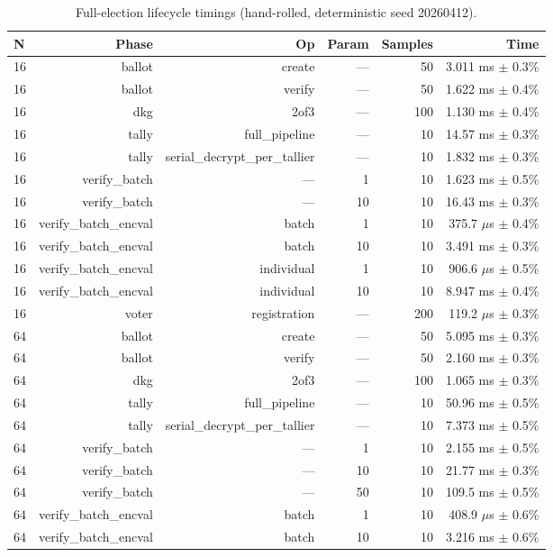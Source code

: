 \begin{table}[h]
  \centering
  \caption{Full-election lifecycle timings (hand-rolled, deterministic seed 20260412).}
  \label{tab:g4_election_lifecycle}
  \begin{tabular}{lrrrrr}
    \toprule
    N & Phase & Op & Param & Samples & Time \\
    \midrule
16 & ballot & create & — & 50 & 3.011 ms $\pm$ 0.3\% \\
16 & ballot & verify & — & 50 & 1.622 ms $\pm$ 0.4\% \\
16 & dkg & 2of3 & — & 100 & 1.130 ms $\pm$ 0.4\% \\
16 & tally & full\_pipeline & — & 10 & 14.57 ms $\pm$ 0.3\% \\
16 & tally & serial\_decrypt\_per\_tallier & — & 10 & 1.832 ms $\pm$ 0.3\% \\
16 & verify\_batch & — & 1 & 10 & 1.623 ms $\pm$ 0.5\% \\
16 & verify\_batch & — & 10 & 10 & 16.43 ms $\pm$ 0.3\% \\
16 & verify\_batch\_encval & batch & 1 & 10 & 375.7 $\mu$s $\pm$ 0.4\% \\
16 & verify\_batch\_encval & batch & 10 & 10 & 3.491 ms $\pm$ 0.3\% \\
16 & verify\_batch\_encval & individual & 1 & 10 & 906.6 $\mu$s $\pm$ 0.5\% \\
16 & verify\_batch\_encval & individual & 10 & 10 & 8.947 ms $\pm$ 0.4\% \\
16 & voter & registration & — & 200 & 119.2 $\mu$s $\pm$ 0.3\% \\
64 & ballot & create & — & 50 & 5.095 ms $\pm$ 0.3\% \\
64 & ballot & verify & — & 50 & 2.160 ms $\pm$ 0.3\% \\
64 & dkg & 2of3 & — & 100 & 1.065 ms $\pm$ 0.3\% \\
64 & tally & full\_pipeline & — & 10 & 50.96 ms $\pm$ 0.5\% \\
64 & tally & serial\_decrypt\_per\_tallier & — & 10 & 7.373 ms $\pm$ 0.5\% \\
64 & verify\_batch & — & 1 & 10 & 2.155 ms $\pm$ 0.5\% \\
64 & verify\_batch & — & 10 & 10 & 21.77 ms $\pm$ 0.3\% \\
64 & verify\_batch & — & 50 & 10 & 109.5 ms $\pm$ 0.5\% \\
64 & verify\_batch\_encval & batch & 1 & 10 & 408.9 $\mu$s $\pm$ 0.6\% \\
64 & verify\_batch\_encval & batch & 10 & 10 & 3.216 ms $\pm$ 0.6\% \\

\end{tabular}
\end{table}
